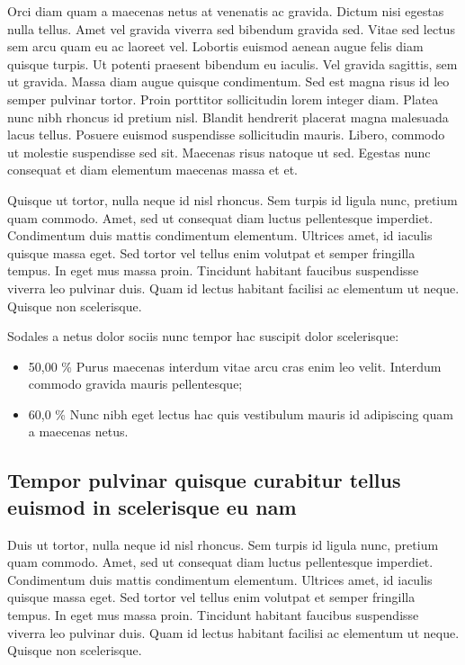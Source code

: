 \documentclass[
]{HyperedReport}
\begin{document}
Orci diam quam a maecenas netus at venenatis ac gravida. Dictum nisi egestas nulla tellus. Amet vel gravida viverra sed bibendum gravida sed. Vitae sed lectus sem arcu quam eu ac laoreet vel. Lobortis euismod aenean augue felis diam quisque turpis. Ut potenti praesent bibendum eu iaculis. Vel gravida sagittis, sem ut gravida. Massa diam augue quisque condimentum. Sed est magna risus id leo semper pulvinar tortor. Proin porttitor sollicitudin lorem integer diam. Platea nunc nibh rhoncus id pretium nisl. Blandit hendrerit placerat magna malesuada lacus tellus. Posuere euismod suspendisse sollicitudin mauris. Libero, commodo ut molestie suspendisse sed sit. Maecenas risus natoque ut sed. Egestas nunc consequat et diam elementum maecenas massa et et.

Quisque ut tortor, nulla neque id nisl rhoncus. Sem turpis id ligula nunc, pretium quam commodo. Amet, sed ut consequat diam luctus pellentesque imperdiet. Condimentum duis mattis condimentum elementum. Ultrices amet, id iaculis quisque massa eget. Sed tortor vel tellus enim volutpat et semper fringilla tempus. In eget mus massa proin. Tincidunt habitant faucibus suspendisse viverra leo pulvinar duis. Quam id lectus habitant facilisi ac elementum ut neque. Quisque non scelerisque.

Sodales a netus dolor sociis nunc tempor hac suscipit dolor scelerisque:

\begin{itemize}
	\item 50,00 \% Purus maecenas interdum vitae arcu cras enim leo velit. Interdum commodo gravida mauris pellentesque;
	\item 60,0 \% Nunc nibh eget lectus hac quis vestibulum mauris id adipiscing quam a maecenas netus.
\end{itemize}

\subsection[Tempor pulvinar quisque curabitur tellus\newline euismod in scelerisque eu nam]{Tempor pulvinar quisque curabitur tellus euismod in scelerisque eu nam}

Duis ut tortor, nulla neque id nisl rhoncus. Sem turpis id ligula nunc, pretium quam commodo. Amet, sed ut consequat diam luctus pellentesque imperdiet. Condimentum duis mattis condimentum elementum. Ultrices amet, id iaculis quisque massa eget. Sed tortor vel tellus enim volutpat et semper fringilla tempus. In eget mus massa proin. Tincidunt habitant faucibus suspendisse viverra leo pulvinar duis. Quam id lectus habitant facilisi ac elementum ut neque. Quisque non scelerisque.
\end{document}
